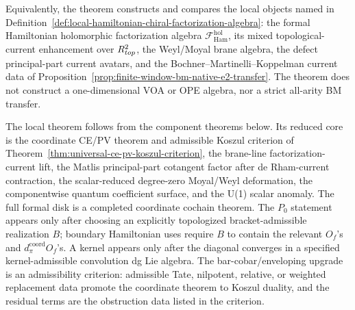 \documentclass[11pt]{memoir}
\begin{document}
Equivalently, the theorem constructs and compares the local objects named
in Definition~\ref{def:local-hamiltonian-chiral-factorization-algebra}:
the formal Hamiltonian holomorphic factorization algebra
\(\mathcal F_{\mathrm{Ham}}^{\mathrm{hol}}\), its mixed
topological-current enhancement over \(R^2_{top}\), the
Weyl/Moyal brane algebra, the defect principal-part current avatars, and
the Bochner--Martinelli--Koppelman current data of
Proposition~\ref{prop:finite-window-bm-native-e2-transfer}.  The theorem
does not construct a one-dimensional VOA or OPE algebra, nor a strict
all-arity BM transfer.

The local theorem follows from the component theorems below. Its
reduced core is the coordinate CE/PV theorem and admissible Koszul
criterion of
Theorem~\ref{thm:universal-ce-pv-koszul-criterion}, the brane-line
factorization-current lift, the Matlis principal-part cotangent factor
after de Rham-current contraction, the scalar-reduced degree-zero
  Moyal/Weyl deformation, the componentwise quantum coefficient surface,
  and the U(1) scalar anomaly.  The full formal
  disk is a completed coordinate cochain theorem.  The \(P_0\) statement
  appears only after choosing an explicitly topologized
  bracket-admissible realization \(B\); boundary Hamiltonian uses require
  \(B\) to contain the relevant \(O_f\)'s and
  \(d_\pi^{\mathrm{coord}}O_f\)'s.  A kernel appears only after the
  diagonal converges in a specified kernel-admissible convolution dg Lie
  algebra.  The bar-cobar/enveloping upgrade is an admissibility
criterion:
admissible Tate, nilpotent, relative, or weighted replacement data
promote the coordinate theorem to Koszul duality, and the residual terms
are the obstruction data listed in the criterion.
\end{document}
